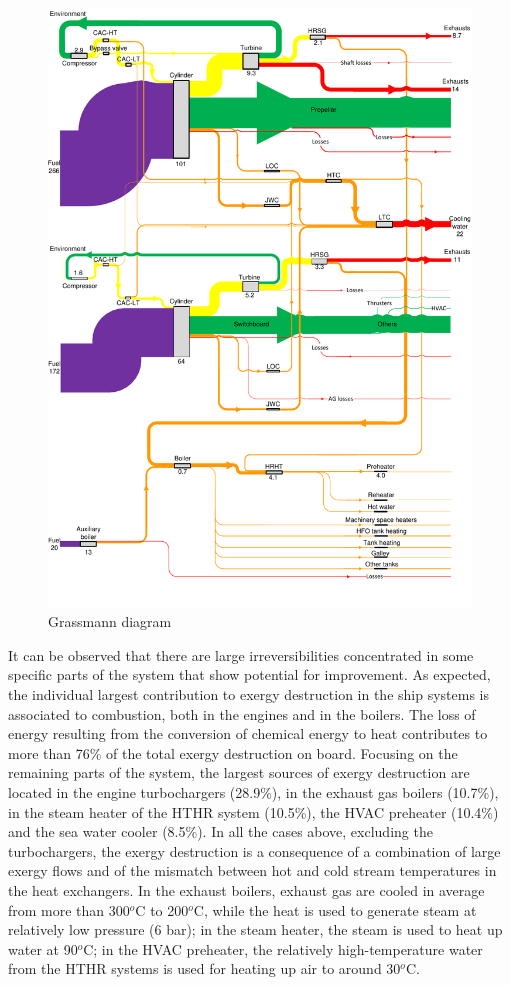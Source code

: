 \documentclass[preprint,12pt]{elsarticle}
\begin{document}
\begin{figure}
	\centering
	\includegraphics[width=0.99\linewidth]{Figures/Grassmann_diagram_v5}
	\caption{Grassmann diagram}
	\label{fig:Grassmann}
\end{figure}

It can be observed that there are large irreversibilities concentrated in some specific parts of the system that show potential for improvement. As expected, the individual largest contribution to exergy destruction in the ship systems is associated to combustion, both in the engines and in the boilers. The loss of energy resulting from the conversion of chemical energy to heat contributes to more than 76\% of the total exergy destruction on board. Focusing on the remaining parts of the system, the largest sources of exergy destruction are located in the engine turbochargers (28.9\%), in the exhaust gas boilers (10.7\%), in the steam heater of the HTHR system (10.5\%), the HVAC preheater (10.4\%) and the sea water cooler (8.5\%). In all the cases above, excluding the turbochargers, the exergy destruction is a consequence of a combination of large exergy flows and of the mismatch between hot and cold stream temperatures in the heat exchangers. In the exhaust boilers, exhaust gas are cooled in average from more than 300$^o$C to 200$^o$C, while the heat is used to generate steam at relatively low pressure (6 bar); in the steam heater, the steam is used to heat up water at 90$^o$C; in the HVAC preheater, the relatively high-temperature water from the HTHR systems is used for heating up air to around 30$^o$C.
\end{document}
